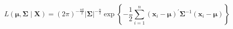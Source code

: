 \begin{equation}
    L
    \left(
    \boldsymbol{\mu},
    \boldsymbol{\Sigma}
    \mid
    \mathbf{X}
    \right)
    =
    \left(
    2
    \pi
    \right)^{-\frac{nk}{2}}
    \left|
    \boldsymbol{\Sigma}
    \right|^{-\frac{n}{2}}
    \exp
    \left\{
    -
    \frac{1}{2}
    \sum_{i = 1}^{n}
    \left(
      \mathbf{x}_{i}
      -
      \boldsymbol{\mu}
    \right)^{\prime}
    \boldsymbol{\Sigma}^{-1}
    \left(
      \mathbf{x}_{i}
      -
      \boldsymbol{\mu}
    \right)
    \right\}
    \label{eq:multiNorm-mvn-likelihood}
\end{equation}

